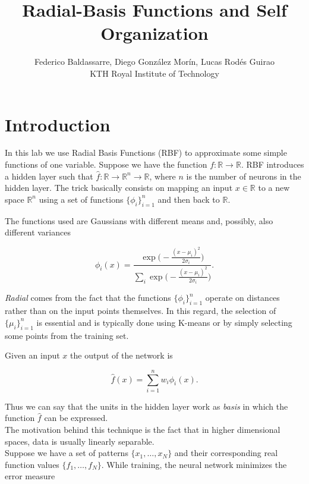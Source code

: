 \documentclass[letterpaper, 10 pt, conference]{ieeeconf}  %
\title{\LARGE \bf
Radial-Basis Functions and Self Organization}
\author{ Federico Baldassarre, Diego Gonz\'alez Mor\'in, Lucas Rod\'es Guirao \\
KTH Royal Institute of Technology
}
\begin{document}
\maketitle
\thispagestyle{empty}
\pagestyle{empty}






\section{Introduction}
In this lab we use Radial Basis Functions (RBF) to approximate some simple functions of one variable. Suppose we have the function $f: \mathbb{R} \to \mathbb{R}$. RBF introduces a hidden layer such that $\hat{f}: \mathbb{R} \to \mathbb{R}^n \to \mathbb{R}$, where $n$ is the number of neurons in the hidden layer. The trick basically consists on mapping an input $x \in \mathbb{R}$ to a new space $\mathbb{R}^n$ using a set of functions $\{\phi_i\}_{i=1}^n$ and then back to $\mathbb{R}$. 


The functions used are Gaussians with different means and, possibly, also different variances

$$
\phi_i(x) = \frac{\exp \Big(-\frac{(x-\mu_i)^2}{2\sigma_i}\Big)}{\sum_i \exp \Big(-\frac{(x-\mu_i)^2}{2\sigma_i}\Big)}.
$$

\emph{Radial} comes from the fact that the functions $\{\phi_i\}_{i=1}^n$ operate on distances rather than on the input points themselves. In this regard, the selection of $\{\mu_i\}_{i=1}^n$ is essential and is typically done using K-means or by simply selecting some points from the training set. 

Given an input $x$ the output of the network is

$$
\hat{f}(x) = \sum_{i=1}^n w_i \phi_i(x).
$$


Thus we can say that the units in the hidden layer work as \emph{basis} in which the function $\hat{f}$ can be expressed. \\

The motivation behind this technique is the fact that in higher dimensional spaces, data is usually linearly separable. \\

Suppose we have a set of patterns $\{x_1, \dots, x_N\}$ and their corresponding real function values $\{f_1, \dots, f_N\}$. While training, the neural network minimizes the error measure
\end{document}
